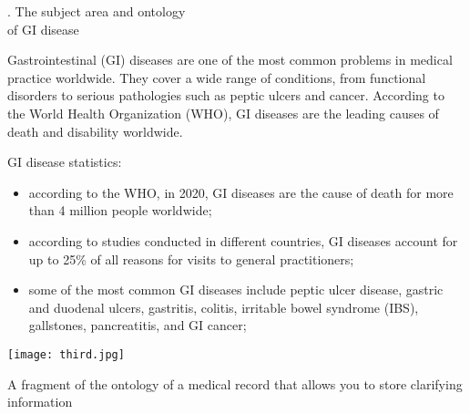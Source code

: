 \documentclass[10pt, a4paper]{article}
\newcommand{\RomanNumeralCaps}[1]
    {\MakeUppercase{\romannumeral #1}}
\begin{document}
\fontsize{10}{14}\selectfont
\begin{multicols}{2}
\setlength{\parindent}{0.8cm}
\par
\setlength{\parindent}{0.3cm}
\fontsize{10}{15}\selectfont
\begin{center}
    \RomanNumeralCaps{5}. The subject area and ontology 
    \\
    of GI disease
\end{center}
\par
Gastrointestinal (GI) diseases are one of the most common problems in medical practice worldwide. They cover a wide range of conditions, from functional disorders to serious pathologies such as peptic ulcers and cancer. According to the World Health Organization (WHO), GI diseases are the leading causes of death and disability worldwide.
\par
GI disease statistics:
\setlength{\parindent}{0.0cm}
\par
\setlength{\parindent}{0.0cm}
\fontsize{10}{15}\selectfont
\begin{itemize}
    \item according to the WHO, in 2020, GI diseases are the cause of death for more than 4 million people worldwide;
    \item according to studies conducted in different countries, GI diseases account for up to 25\% of all reasons for visits to general practitioners;
    \item some of the most common GI diseases include peptic ulcer disease, gastric and duodenal ulcers, gastritis, colitis, irritable bowel syndrome (IBS), gallstones, pancreatitis, and GI cancer;
\end{itemize}
\fontsize{8}{8}\selectfont
\begin{minipage}{0.45\textwidth} %
    \texttt{[image: third.jpg]}
    \caption{A fragment of the ontology of a medical record that allows you to store clarifying information}
    \label{ris:third}
\end{minipage}


\end{multicols}
\end{document}
